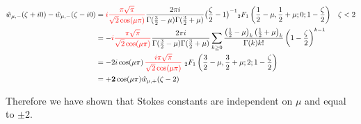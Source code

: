 \documentclass{article}
\begin{document}
\begin{align*}
\hat{w}_{\mu,-}(\zeta+i0)-\hat{w}_{\mu,-}(\zeta-i0)&=\textcolor{red}{i\frac{\pi\sqrt{\pi}}{\sqrt{2}\cos(\mu \pi)}}\frac{2\pi i}{\Gamma(\tfrac{3}{2}-\mu)\Gamma(\tfrac{3}{2}+\mu)}\big(\frac{\zeta}{2}-1\big)^{-1}{}_2F_1\left(\frac{1}{2}-\mu,\frac{1}{2}+\mu;0;1-\frac{\zeta}{2}\right) & \zeta<2 \\
&=-\textcolor{red}{i\frac{\pi\sqrt{\pi}}{\sqrt{2}\cos(\mu \pi)}}\frac{2\pi i}{\Gamma(\tfrac{3}{2}-\mu)\Gamma(\tfrac{3}{2}+\mu)}\sum_{k\geq 0}\frac{\left(\tfrac{1}{2}-\mu\right)_k\left(\tfrac{1}{2}+\mu\right)_k}{\Gamma(k)k!}\left(1-\frac{\zeta}{2}\right)^{k-1} & \\
&=-2i\cos(\mu \pi)\,\textcolor{red}{\frac{i\pi\sqrt{\pi}}{\sqrt{2}\cos(\mu \pi)}}\,\, {}_2F_1\left(\frac{3}{2}-\mu,\frac{3}{2}+\mu;2;1-\frac{\zeta}{2}\right) & \\
&=\mathbf{+2}\cos(\mu \pi)\hat{w}_{\mu,+}(\zeta-2)
\end{align*}

Therefore we have shown that Stokes constants are independent on $\mu$ and equal to $\pm 2$.







\end{document}
